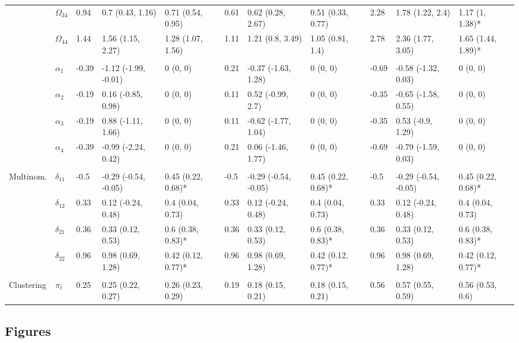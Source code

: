 \documentclass{article}
\begin{document}
\begin{landscape}
\begin{table}[t]
\begin{tabular}{lllllllllll}
\hspace{1em} & $\Omega_{34}$ & 0.94 & 0.7 (0.43, 1.16) & 0.71 (0.54, 0.95) & 0.61 & 0.62 (0.28, 2.67) & 0.51 (0.33, 0.77) & 2.28 & 1.78 (1.22, 2.4) & 1.17 (1, 1.38)*\\
\hspace{1em} & $\Omega_{44}$ & 1.44 & 1.56 (1.15, 2.27) & 1.28 (1.07, 1.56) & 1.11 & 1.21 (0.8, 3.49) & 1.05 (0.81, 1.4) & 2.78 & 2.36 (1.77, 3.05) & 1.65 (1.44, 1.89)*\\
\addlinespace[0.3em]
\multicolumn{11}{l}{\textbf{ }}\\
\hspace{1em} & $\alpha_{1}$ & -0.39 & -1.12 (-1.99, -0.01) & 0 (0, 0) & 0.21 & -0.37 (-1.63, 1.28) & 0 (0, 0) & -0.69 & -0.58 (-1.32, 0.03) & 0 (0, 0)\\
\hspace{1em} & $\alpha_{2}$ & -0.19 & 0.16 (-0.85, 0.98) & 0 (0, 0) & 0.11 & 0.52 (-0.99, 2.7) & 0 (0, 0) & -0.35 & -0.65 (-1.58, 0.55) & 0 (0, 0)\\
\hspace{1em} & $\alpha_{3}$ & -0.19 & 0.88 (-1.11, 1.66) & 0 (0, 0) & 0.11 & -0.62 (-1.77, 1.04) & 0 (0, 0) & -0.35 & 0.53 (-0.9, 1.29) & 0 (0, 0)\\
\hspace{1em} & $\alpha_{4}$ & -0.39 & -0.99 (-2.24, 0.42) & 0 (0, 0) & 0.21 & 0.06 (-1.46, 1.77) & 0 (0, 0) & -0.69 & -0.79 (-1.59, 0.03) & 0 (0, 0)\\
\addlinespace[0.3em]
\multicolumn{11}{l}{\textbf{ }}\\
\hspace{1em}Multinom. & $\delta_{11}$ & -0.5 & -0.29 (-0.54, -0.05) & 0.45 (0.22, 0.68)* & -0.5 & -0.29 (-0.54, -0.05) & 0.45 (0.22, 0.68)* & -0.5 & -0.29 (-0.54, -0.05) & 0.45 (0.22, 0.68)*\\
\hspace{1em} & $\delta_{12}$ & 0.33 & 0.12 (-0.24, 0.48) & 0.4 (0.04, 0.73) & 0.33 & 0.12 (-0.24, 0.48) & 0.4 (0.04, 0.73) & 0.33 & 0.12 (-0.24, 0.48) & 0.4 (0.04, 0.73)\\
\hspace{1em} & $\delta_{21}$ & 0.36 & 0.33 (0.12, 0.53) & 0.6 (0.38, 0.83)* & 0.36 & 0.33 (0.12, 0.53) & 0.6 (0.38, 0.83)* & 0.36 & 0.33 (0.12, 0.53) & 0.6 (0.38, 0.83)*\\
\hspace{1em} & $\delta_{22}$ & 0.96 & 0.98 (0.69, 1.28) & 0.42 (0.12, 0.77)* & 0.96 & 0.98 (0.69, 1.28) & 0.42 (0.12, 0.77)* & 0.96 & 0.98 (0.69, 1.28) & 0.42 (0.12, 0.77)*\\
\addlinespace[0.3em]
\multicolumn{11}{l}{\textbf{ }}\\
\hspace{1em}Clustering & $\pi_l$ & 0.25 & 0.25 (0.22, 0.27) & 0.26 (0.23, 0.29) & 0.19 & 0.18 (0.15, 0.21) & 0.18 (0.15, 0.21) & 0.56 & 0.57 (0.55, 0.59) & 0.56 (0.53, 0.6)\\
\bottomrule
\end{tabular}
\end{table}
\end{landscape}

\subsection{Figures}
\end{document}
